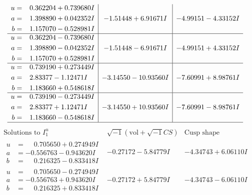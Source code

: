 \documentclass[1p]{elsarticle_modified}
\theoremstyle{definition}
\newcommand{\I}{\sqrt{-1}}
\begin{document}
$$\begin{array}{c|c|c}
\begin{aligned}
u &= \phantom{-}0.362204 + 0.739680 I \\
a &= \phantom{-}1.398890 + 0.042352 I \\
b &= \phantom{-}1.157070 - 0.528981 I\end{aligned}
 & -1.51448 + 6.91671 I & -4.99151 - 4.33152 I \\ \hline\begin{aligned}
u &= \phantom{-}0.362204 - 0.739680 I \\
a &= \phantom{-}1.398890 - 0.042352 I \\
b &= \phantom{-}1.157070 + 0.528981 I\end{aligned}
 & -1.51448 - 6.91671 I & -4.99151 + 4.33152 I \\ \hline\begin{aligned}
u &= \phantom{-}0.739190 + 0.273449 I \\
a &= \phantom{-}2.83377 - 1.12471 I \\
b &= \phantom{-}1.183660 + 0.548618 I\end{aligned}
 & -3.14550 - 10.93560 I & -7.60991 + 8.98761 I \\ \hline\begin{aligned}
u &= \phantom{-}0.739190 - 0.273449 I \\
a &= \phantom{-}2.83377 + 1.12471 I \\
b &= \phantom{-}1.183660 - 0.548618 I\end{aligned}
 & -3.14550 + 10.93560 I & -7.60991 - 8.98761 I\\
 \hline 
 \end{array}$$\newpage$$\begin{array}{c|c|c}  
\text{Solutions to }I^u_{1}& \I (\text{vol} + \sqrt{-1}CS) & \text{Cusp shape}\\
 \hline 
\begin{aligned}
u &= \phantom{-}0.705650 + 0.274949 I \\
a &= -0.556763 - 0.943620 I \\
b &= \phantom{-}0.216325 - 0.833418 I\end{aligned}
 & -0.27172 - 5.84779 I & -4.34743 + 6.06110 I \\ \hline\begin{aligned}
u &= \phantom{-}0.705650 - 0.274949 I \\
a &= -0.556763 + 0.943620 I \\
b &= \phantom{-}0.216325 + 0.833418 I\end{aligned}
 & -0.27172 + 5.84779 I & -4.34743 - 6.06110 I \\ \hline\begin{aligned}

\end{aligned}
\end{array}$$
\end{document}
